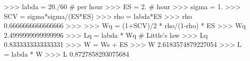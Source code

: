 
>>> labda = 20./60 # per hour
>>> ES = 2. # hour
>>> sigma = 1.
>>> SCV = sigma*sigma/(ES*ES)
>>> rho = labda*ES
>>> rho
0.6666666666666666
>>>
>>> Wq = (1+SCV)/2 * rho/(1-rho) * ES
>>> Wq
2.4999999999999996
>>> Lq = labda * Wq # Little's law
>>> Lq
0.8333333333333331
>>> W = Ws + ES
>>> W
2.6183574879227054
>>> L = labda * W
>>> L
0.8727858293075684

